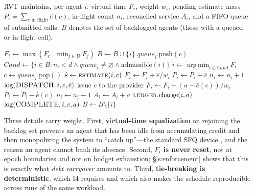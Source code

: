 \documentclass[letterpaper,11pt,leqno]{article}
\begin{document}
RVT maintains, per agent $i$: virtual time $F_i$, weight $w_i$, pending estimate mass $P_i = \sum_{c \text{ in flight}} \hat{e}(c)$, in-flight count $n_i$, reconciled service $A_i$, and a FIFO queue of submitted calls. $B$ denotes the set of backlogged agents (those with a queued or in-flight call).

\begin{algorithm}[t]
\caption{Reconciled Virtual Time}
\label{alg:rvt}
\begin{algorithmic}[1]
        \State $F_i \gets \max(F_i,\; \min_{j \in B} F_j)$
    \EndIf
    \State $B \gets B \cup \{i\}$
    \State $\mathit{queue}_i.\mathrm{push}(c)$
    \State {}
\EndProcedure
\State
{}
    \State $\mathit{Cand} \gets \{ i \in B : n_i < d \land \mathit{queue}_i \neq \varnothing \land \mathrm{admissible}(i) \}$
        \State \Return
    \EndIf
    \State $i \gets \operatorname*{arg\,min}_{i \in \mathit{Cand}} F_i$ 
    \State $c \gets \mathit{queue}_i.\mathrm{pop}()$
    \State $\hat{e} \gets \textsc{estimate}(i, c)$
    \State $F_i \gets F_i + \hat{e} / w_i$
    \State $P_i \gets P_i + \hat{e}$
    \State $n_i \gets n_i + 1$
    \State $\log(\textsc{DISPATCH}, i, c, \hat{e})$ 
    \State issue $c$ to the provider
\EndProcedure
\State
{}
    \State $F_i \gets F_i + (a - \hat{e}(c)) / w_i$ 
    \State $P_i \gets P_i - \hat{e}(c)$
    \State $n_i \gets n_i - 1$
    \State $A_i \gets A_i + a$
    \State $\textsc{ledger}.\mathrm{charge}(i, a)$ 
    \State $\log(\textsc{COMPLETE}, i, c, a)$
        \State $B \gets B \setminus \{i\}$
    \EndIf
    \State {}
\EndProcedure
\end{algorithmic}
\end{algorithm}

Three details carry weight. First, \textbf{virtual-time equalization} on rejoining the backlog set prevents an agent that has been idle from accumulating credit and then monopolizing the system to ``catch up''---the standard SFQ device \citep{Goyal96}, and the reason an agent cannot bank its absence. Second, \textbf{$F_i$ is never reset}, not at epoch boundaries and not on budget exhaustion; \S\ref{s:enforcement} shows that this is exactly what \emph{debt carryover} amounts to. Third, \textbf{tie-breaking is deterministic}, which I4 requires and which also makes the schedule reproducible across runs of the same workload.
\end{document}
